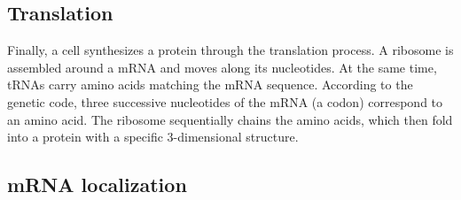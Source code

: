 \subsection{Translation}
\label{subsec:intro_translation}

Finally, a cell synthesizes a protein through the translation process.
A ribosome is assembled around a \ac{mRNA} and moves along its nucleotides.
At the same time, \ac{tRNA}s carry amino acids matching the \ac{mRNA} sequence.
According to the genetic code, three successive nucleotides of the \ac{mRNA} (a codon) correspond to an amino acid.
The ribosome sequentially chains the amino acids, which then fold into a protein with a specific 3-dimensional structure.


\subsection{mRNA localization}
\label{subsec:intro_rna_loc}








